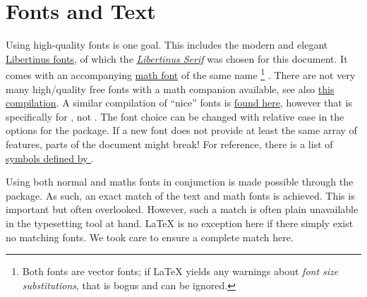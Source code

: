 \section{Fonts and Text}
\label{ch:fonts_text}

Using high-quality fonts is one goal.
This includes the modern and elegant
\href{https://github.com/alif-type/libertinus}{Libertinus fonts},
of which the \emph{\href{https://github.com/alif-type/libertinus}{Libertinus Serif}}
was chosen for this document.
It comes with an accompanying
\href{https://github.com/alif-type/libertinus}{math font}
of the same name%
\footnote{
    Both fonts are vector fonts;
    if \LaTeX{} yields any warnings about \emph{font size substitutions},
    that is bogus and can be ignored.
}%
.
There are not very many high\-/quality free fonts with a math companion available,
see also \href{https://tex.stackexchange.com/a/425099/120853}{this compilation}.
A similar compilation of \enquote{nice} fonts is
\href{https://tex.stackexchange.com/a/59706/120853}{found here},
however that is specifically for , not .
The font choice can be changed with relative ease in the options for the
 package.
If a new font does not provide at least the same array of features,
parts of the document might break!
For reference, there is a list of
\href{http://mirrors.ctan.org/macros/unicodetex/latex/unicode-math/unimath-symbols.pdf}{symbols defined by }.

Using both normal and maths fonts in conjunction is made possible through the
 package.
As such, an exact match of the text and math fonts is achieved.
This is important but often overlooked.
However, such a match is often plain unavailable in the typesetting tool at hand.
\LaTeX{} is no exception here if there simply exist no matching fonts.
We took care to ensure a complete match here.

